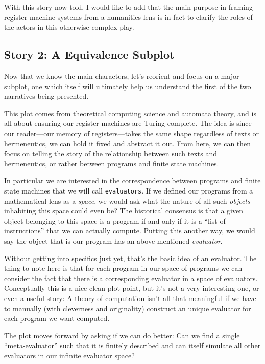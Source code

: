 \documentclass[twoside]{article}
\begin{document}
With this story now told, I would like to add that the main purpose in framing register machine systems from
a humanities lens is in fact to clarify the roles of the actors in this otherwise complex play.

\subsection*{Story 2: A Equivalence Subplot}

Now that we know the main characters, let's reorient and focus on a major subplot, one which itself will ultimately
help us understand the first of the two narratives being presented.

This plot comes from theoretical computing science and automata theory, and is all about ensuring our register machines
are Turing complete. The idea is since our reader---our memory of registers---takes the same shape regardless of texts
or hermeneutics, we can hold it fixed and abstract it out. From here, we can then focus on telling the story of the
relationship between such texts and hermeneutics, or rather between programs and finite state machines.

In particular we are interested in the correspondence between programs and finite state machines that we will call
\texttt{evaluators}. If we defined our programs from a mathematical lens as a \emph{space}, we would ask what the nature
of all such \emph{objects} inhabiting this space could even be? The historical consensus is that a given object belonging
to this space is a program if and only if it is a ``list of instructions'' that we can actually compute. Putting this
another way, we would say the object that is our program has an above mentioned \emph{evaluator}.

Without getting into specifics just yet, that's the basic idea of an evaluator. The thing to note here is that for each
program in our space of programs we can consider the fact that there is a corresponding evaluator in a space of evaluators.
Conceptually this is a nice clean plot point, but it's not a very interesting one, or even a useful story: A theory of
computation isn't all that meaningful if we have to manually (with cleverness and originality) construct an unique
evaluator for each program we want computed.

The plot moves forward by asking if we can do better: Can we find a single ``meta-evaluator'' such that it is finitely
described and can itself simulate all other evaluators in our infinite evaluator space?
\end{document}
